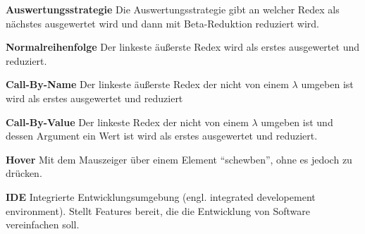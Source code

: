 \documentclass[parskip=full,11pt,twoside]{scrartcl}
\begin{document}
\textbf{Auswertungsstrategie}
Die Auswertungsstrategie gibt an welcher Redex als nächstes ausgewertet wird und dann mit Beta-Reduktion reduziert wird.

\textbf{Normalreihenfolge}
Der linkeste äußerste Redex wird als erstes ausgewertet und reduziert.

\textbf{Call-By-Name}
Der linkeste äußerste Redex der nicht von einem $\lambda$ umgeben ist wird als erstes ausgewertet und reduziert

\textbf{Call-By-Value}
Der linkeste Redex der nicht von einem $\lambda$ umgeben ist und dessen Argument ein Wert ist wird als erstes ausgewertet und reduziert.

\textbf{Hover}
Mit dem Mauszeiger über einem Element \enquote{schewben}, ohne es jedoch zu drücken.

\textbf{IDE}
Integrierte Entwicklungsumgebung (engl. integrated developement environment). Stellt Features bereit, die die Entwicklung von Software vereinfachen soll.
 
\end{document}
